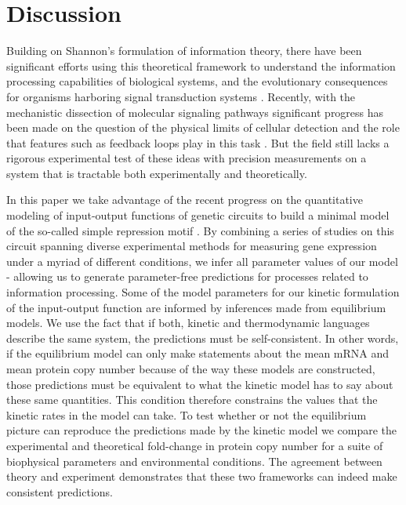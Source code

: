 \section*{Discussion}

Building on Shannon's formulation of information theory, there have been
significant efforts using this theoretical framework to understand the
information processing capabilities of biological systems, and the evolutionary
consequences for organisms harboring signal transduction systems
\cite{Bergstrom2004, Taylor2007, Tkacik2008, Polani2009, Nemenman2010,
Rivoire2011}. Recently, with the mechanistic dissection of molecular signaling
pathways significant progress has been made on the question of the physical
limits of cellular detection and the role that features such as feedback loops
play in this task \cite{Bialek2005, Libby2007, Tkacik2011, Rhee2012a,
Voliotis2014a}. But the field still lacks a rigorous experimental test of these
ideas with precision measurements on a system that is tractable both
experimentally and theoretically.

In this paper we take advantage of the recent progress on the quantitative
modeling of input-output functions of genetic circuits to build a minimal model
of the so-called simple repression motif \cite{Phillips2019}. By combining a
series of studies on this circuit spanning diverse experimental methods for
measuring gene expression under a myriad of different conditions, we infer all
parameter values of our model - allowing us to generate parameter-free
predictions for processes related to information processing. Some of the model
parameters for our kinetic formulation of the input-output function are
informed by inferences made from equilibrium models. We use the fact that if
both, kinetic and thermodynamic languages describe the same system, the
predictions must be self-consistent. In other words, if the equilibrium model
can only make statements about the mean mRNA and mean protein copy number
because of the way these models are constructed, those predictions must be
equivalent to what the kinetic model has to say about these same quantities.
This condition therefore constrains the values that the kinetic rates in the
model can take. To test whether or not the equilibrium picture can reproduce
the predictions made by the kinetic model we compare the experimental and
theoretical fold-change in protein copy number for a suite of biophysical
parameters and environmental conditions. The agreement between theory and
experiment demonstrates that these two frameworks can indeed make consistent
predictions.

